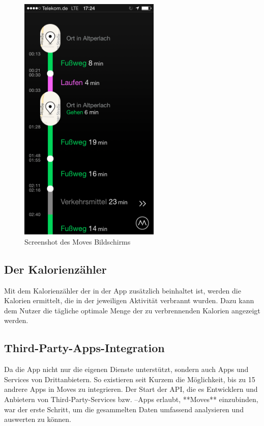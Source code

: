 \begin{figure}[H]
\centering
	\includegraphics[width=0.6\textwidth]{images/moves_app_screenshot} 
	\caption[Screenshot des Moves Bildschirms]{Screenshot des Moves Bildschirms}
	\label{fig:moves_screenshot}
\end{figure}

\subsection{Der Kalorienzähler}

Mit dem Kalorienzähler der in der App zusätzlich beinhaltet ist, werden die Kalorien ermittelt, die in der jeweiligen Aktivität verbrannt wurden. 
Dazu kann dem Nutzer die tägliche optimale Menge der zu verbrennenden Kalorien angezeigt werden.

\subsection{Third-Party-Apps-Integration}

Da die App nicht nur die eigenen Dienste unterstützt, sondern auch Apps und Services von Drittanbietern. 
So existieren seit Kurzem die Möglichkeit, bis zu 15 andrere Apps in Moves zu integrieren. 
Der Start der API, die es Entwicklern und Anbietern von Third-Party-Services bzw. –Apps erlaubt, **Moves** einzubinden, war der erste Schritt, um die gesammelten Daten umfassend analysieren und auswerten zu können.

